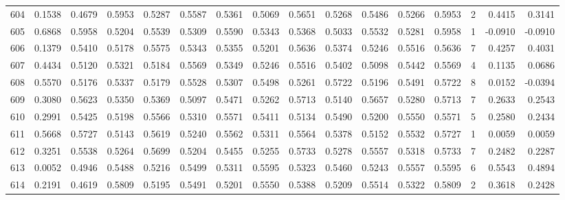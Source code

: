 \begin{tabular}{lrrrrrrrrrrrrrrr}
604 &      0.1538 &  0.4679 &  0.5953 &  0.5287 &  0.5587 &  0.5361 &  0.5069 &  0.5651 &  0.5268 &  0.5486 &   0.5266 &     0.5953 &      2 &                    0.4415 &                     0.3141 \\
605 &      0.6868 &  0.5958 &  0.5204 &  0.5539 &  0.5309 &  0.5590 &  0.5343 &  0.5368 &  0.5033 &  0.5532 &   0.5281 &     0.5958 &      1 &                   -0.0910 &                    -0.0910 \\
606 &      0.1379 &  0.5410 &  0.5178 &  0.5575 &  0.5343 &  0.5355 &  0.5201 &  0.5636 &  0.5374 &  0.5246 &   0.5516 &     0.5636 &      7 &                    0.4257 &                     0.4031 \\
607 &      0.4434 &  0.5120 &  0.5321 &  0.5184 &  0.5569 &  0.5349 &  0.5246 &  0.5516 &  0.5402 &  0.5098 &   0.5442 &     0.5569 &      4 &                    0.1135 &                     0.0686 \\
608 &      0.5570 &  0.5176 &  0.5337 &  0.5179 &  0.5528 &  0.5307 &  0.5498 &  0.5261 &  0.5722 &  0.5196 &   0.5491 &     0.5722 &      8 &                    0.0152 &                    -0.0394 \\
609 &      0.3080 &  0.5623 &  0.5350 &  0.5369 &  0.5097 &  0.5471 &  0.5262 &  0.5713 &  0.5140 &  0.5657 &   0.5280 &     0.5713 &      7 &                    0.2633 &                     0.2543 \\
610 &      0.2991 &  0.5425 &  0.5198 &  0.5566 &  0.5310 &  0.5571 &  0.5411 &  0.5134 &  0.5490 &  0.5200 &   0.5550 &     0.5571 &      5 &                    0.2580 &                     0.2434 \\
611 &      0.5668 &  0.5727 &  0.5143 &  0.5619 &  0.5240 &  0.5562 &  0.5311 &  0.5564 &  0.5378 &  0.5152 &   0.5532 &     0.5727 &      1 &                    0.0059 &                     0.0059 \\
612 &      0.3251 &  0.5538 &  0.5264 &  0.5699 &  0.5204 &  0.5455 &  0.5255 &  0.5733 &  0.5278 &  0.5557 &   0.5318 &     0.5733 &      7 &                    0.2482 &                     0.2287 \\
613 &      0.0052 &  0.4946 &  0.5488 &  0.5216 &  0.5499 &  0.5311 &  0.5595 &  0.5323 &  0.5460 &  0.5243 &   0.5557 &     0.5595 &      6 &                    0.5543 &                     0.4894 \\
614 &      0.2191 &  0.4619 &  0.5809 &  0.5195 &  0.5491 &  0.5201 &  0.5550 &  0.5388 &  0.5209 &  0.5514 &   0.5322 &     0.5809 &      2 &                    0.3618 &                     0.2428 \\

\end{tabular}
